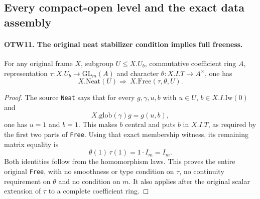\subsection{Every compact-open level and the exact data assembly}

\paragraph{OTW11. The original neat stabilizer condition implies full freeness.}
\label{claim:OTW11}
For any original frame $X$, subgroup $U\leq X.U_b$, commutative
coefficient ring $A$, representation
$\tau:X.U_b\to\mathrm{GL}_m(A)$ and character
$\theta:X.I.T\to A^\times$, one has
\[
                   X.\mathrm{Neat}(U) \Longrightarrow\
                          X.\mathrm{Free}(\tau,\theta,U).
                   \tag{OTW.28}
\]
\begin{proof}
The source \texttt{Neat} says that for every $g,\gamma,u,b$
with $u\in U$, $b\in X.I.\mathrm{Iw}(0)$ and
\[
                     X.\mathrm{glob}(\gamma)g=g(u,b),
                     \tag{OTW.29}
\]
one has $u=1$ and $b=1$.  This makes $b$ central and puts $b$
in $X.I.T$, as required by the first two parts of \texttt{Free}.
Using that exact membership witness, its remaining matrix equality is
\[
                       \theta(1)\,\tau(1)=1\cdot I_m=I_m.
                       \tag{OTW.30}
\]
Both identities follow from the homomorphism laws.  This proves
the entire original \texttt{Free}, with no smoothness or type
condition on $\tau$, no continuity requirement on $\theta$ and
no condition on $m$.  It also applies after the original scalar
extension of $\tau$ to a complete coefficient ring.
\end{proof}

